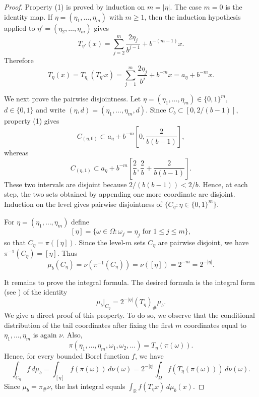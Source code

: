 \documentclass[reqno,a4paper,12pt]{amsart}
\def\R{{\mathbb R}}
\begin{document}
\begin{proof}
Property (1) is proved by induction on $m=|\eta|$. The case
$m=0$ is the identity map. If $\eta=(\eta_1,\ldots,\eta_m)$ with
$m\ge1$, then the induction hypothesis applied to
$\eta'=(\eta_2,\ldots,\eta_m)$ gives
$$
        T_{\eta'}(x)
        =
        \sum_{j=2}^{m}\frac{2\eta_j}{b^{j-1}}+b^{-(m-1)}x.
$$
Therefore
$$
        T_\eta(x)
        =
        T_{\eta_1}(T_{\eta'}x)
        =
        \sum_{j=1}^{m}\frac{2\eta_j}{b^j}+b^{-m}x
        =
        a_\eta+b^{-m}x.
$$

We next prove the pairwise disjointness. Let
$\eta=(\eta_1,\ldots,\eta_m)\in\{0,1\}^m$, $d\in\{0,1\}$ and write
$(\eta,d)=(\eta_1,\ldots,\eta_m,d)$. Since
$C_b\subset[0,2/(b-1)]$, property (1) gives
$$
        C_{(\eta,0)}
        \subset
        a_\eta+b^{-m}\left[0,\frac{2}{b(b-1)}\right],
$$
whereas
$$
        C_{(\eta,1)}
        \subset
        a_\eta+b^{-m}\left[\frac2b,\frac2b+\frac{2}{b(b-1)}\right].
$$
These two intervals are disjoint because $2/(b(b-1))<2/b$. Hence, at
each step, the two sets obtained by appending one more coordinate are
disjoint. Induction on the level gives pairwise disjointness of
$\{C_\eta:\eta\in\{0,1\}^m\}$.

For $\eta=(\eta_1,\ldots,\eta_m)$ define
$$
        [\eta]
        =
        \{\omega\in\Omega:\omega_j=\eta_j \text{ for }1\le j\le m\},
$$
so that $C_\eta=\pi([\eta])$. Since the level-$m$ sets $C_\eta$ are
pairwise disjoint, we have $\pi^{-1}(C_\eta)=[\eta]$. Thus
$$
        \mu_b(C_\eta)
        =
        \nu(\pi^{-1}(C_\eta))
        =
        \nu([\eta])
        =
        2^{-m}
        =
        2^{-|\eta|}.
$$

 It remains to prove the integral formula. The desired formula is the
integral form (see \cite[Lemma~2.5]{khalil2020singular}) of the identity
$$
        \mu_b|_{C_\eta}
        =
        2^{-|\eta|}(T_\eta)_\#\mu_b.
$$
 We give a direct proof of this property. To do so, we observe that the conditional distribution of
the tail coordinates after fixing the first $m$ coordinates equal to
$\eta_1,\ldots,\eta_m$ is again $\nu$. Also,
$$
        \pi(\eta_1,\ldots,\eta_m,\omega_1,\omega_2,\ldots)
        =
        T_\eta(\pi(\omega)).
$$
Hence, for every bounded Borel function $f$, we have
$$
        \int_{C_\eta}f\,d\mu_b
        =
        \int_{[\eta]}f(\pi(\omega))\,d\nu(\omega)
        =
        2^{-|\eta|}
        \int_{\Omega}f(T_\eta(\pi(\omega)))\,d\nu(\omega).
$$
Since $\mu_b=\pi_\#\nu$, the last integral equals
$\int_{\R}f(T_\eta x)\,d\mu_b(x)$.
\end{proof}
\end{document}
